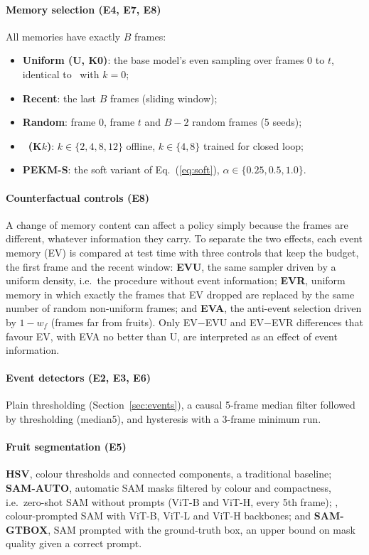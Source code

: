 \paragraph{Memory selection (E4, E7, E8)} All memories have exactly $B$ frames:
\begin{itemize}
\item \textbf{Uniform (U, K0)}: the base model's even sampling over frames 0 to $t$, identical to \pekm\ with $k=0$;
\item \textbf{Recent}: the last $B$ frames (sliding window);
\item \textbf{Random}: frame 0, frame $t$ and $B-2$ random frames (5 seeds);
\item \textbf{\pekm\ (K$k$)}: $k \in \{2, 4, 8, 12\}$ offline, $k \in \{4, 8\}$ trained for closed loop;
\item \textbf{PEKM-S}: the soft variant of Eq.~(\ref{eq:soft}), $\alpha \in \{0.25, 0.5, 1.0\}$.
\end{itemize}

\paragraph{Counterfactual controls (E8)} A change of memory content can affect a policy simply because the frames are different, whatever information they carry. To separate the two effects, each event memory (EV) is compared at test time with three controls that keep the budget, the first frame and the recent window: \textbf{EVU}, the same sampler driven by a uniform density, i.e.\ the procedure without event information; \textbf{EVR}, uniform memory in which exactly the frames that EV dropped are replaced by the same number of random non-uniform frames; and \textbf{EVA}, the anti-event selection driven by $1-w_f$ (frames far from fruits). Only EV$-$EVU and EV$-$EVR differences that favour EV, with EVA no better than U, are interpreted as an effect of event information.

\paragraph{Event detectors (E2, E3, E6)} Plain thresholding (Section~\ref{sec:events}), a causal 5-frame median filter followed by thresholding (median5), and hysteresis with a 3-frame minimum run.

\paragraph{Fruit segmentation (E5)} \textbf{HSV}, colour thresholds and connected components, a traditional baseline; \textbf{SAM-AUTO}, automatic SAM masks filtered by colour and compactness, i.e.\ zero-shot SAM without prompts (ViT-B and ViT-H, every 5th frame); \textbf{\fdm}, colour-prompted SAM with ViT-B, ViT-L and ViT-H backbones; and \textbf{SAM-GTBOX}, SAM prompted with the ground-truth box, an upper bound on mask quality given a correct prompt.

